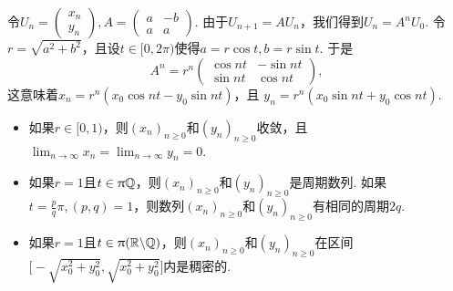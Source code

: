 \begin{solution}
  令$U_n=\begin{pmatrix}
    x_n \\ y_n
  \end{pmatrix},A=\begin{pmatrix}
    a & -b \\
    a & a
  \end{pmatrix}$. 由于$U_{n+1}=AU_n$，我们得到$U_n=A^nU_0$. 令$r=\sqrt{a^2+b^2}$，且设$t\in[0,2\pi)$使得$a=r\cos t,b=r\sin t$. 于是
  \[
    A^n = r^n\begin{pmatrix}
      \cos nt & -\sin nt \\
      \sin nt & \cos nt
    \end{pmatrix},
  \]
  这意味着$x_n=r^n(x_0\cos nt-y_0\sin nt)$，且
  $y_n=r^n(x_0\sin nt+y_0\cos nt)$.
  \begin{itemize}
    \item 如果$r\in[0,1)$，则$(x_n)_{n\ge0}$和$(y_n)_{n\ge0}$收敛，且$\lim_{n\to\infty}x_n=\lim_{n\to\infty}y_n=0$.
    \item 如果$r=1$且$t\in\uppi \mathbb Q$，则$(x_n)_ {n\ge0}$和$(y_n)_{n\ge0}$是周期数列. 如果$t=\frac pq\pi,(p,q)=1$，则数列$(x_n)_ {n\ge0}$和$(y_n)_{n\ge0}$有相同的周期$2q$.
    \item 如果$r=1$且$t\in\uppi(\mathbb R\backslash\mathbb Q)$，则$(x_n)_ {n\ge0}$和$(y_n)_{n\ge0}$在区间$\big[-\sqrt{x_0^2+y_0^2},\sqrt{x_0^2+y_0^2}
        \big]$内是稠密的.
  \end{itemize}
\end{solution}

